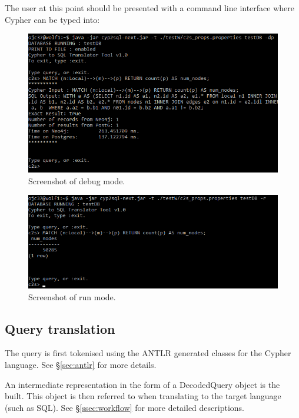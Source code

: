 \documentclass[letterpaper]{ltxdoc}
\begin{document}
\medskip

The user at this point should be presented with a command line interface where Cypher can be typed into:

\begin{figure}[h]
\centerline{\includegraphics[width=\textwidth,height=\textheight,keepaspectratio]{ss1.png}}
\caption{Screenshot of debug mode.}
\label{ss1}
\end{figure}

\begin{figure}[h]
\centerline{\includegraphics[width=\textwidth,height=\textheight,keepaspectratio]{ss2.png}}
\caption{Screenshot of run mode.}
\label{ss2}
\end{figure}


\subsection{Query translation}
The query is first tokenised using the ANTLR generated classes for the Cypher language. See \S \ref{sec:antlr} for more details.

An intermediate representation in the form of a DecodedQuery object is the built. This object is then referred to when translating to the target language (such as SQL). See \S \ref{ssec:workflow} for more detailed descriptions.
\end{document}
